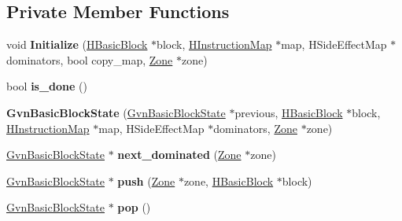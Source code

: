 \subsection*{Private Member Functions}
\begin{DoxyCompactItemize}
\item 
void {\bfseries Initialize} (\hyperlink{classv8_1_1internal_1_1_h_basic_block}{H\+Basic\+Block} $\ast$block, \hyperlink{classv8_1_1internal_1_1_h_instruction_map}{H\+Instruction\+Map} $\ast$map, H\+Side\+Effect\+Map $\ast$dominators, bool copy\+\_\+map, \hyperlink{classv8_1_1internal_1_1_zone}{Zone} $\ast$zone)\hypertarget{classv8_1_1internal_1_1_gvn_basic_block_state_ae5463e112b8d81ce383a5835380035be}{}\label{classv8_1_1internal_1_1_gvn_basic_block_state_ae5463e112b8d81ce383a5835380035be}

\item 
bool {\bfseries is\+\_\+done} ()\hypertarget{classv8_1_1internal_1_1_gvn_basic_block_state_ac8820611886e4e9bfa41b25525c80591}{}\label{classv8_1_1internal_1_1_gvn_basic_block_state_ac8820611886e4e9bfa41b25525c80591}

\item 
{\bfseries Gvn\+Basic\+Block\+State} (\hyperlink{classv8_1_1internal_1_1_gvn_basic_block_state}{Gvn\+Basic\+Block\+State} $\ast$previous, \hyperlink{classv8_1_1internal_1_1_h_basic_block}{H\+Basic\+Block} $\ast$block, \hyperlink{classv8_1_1internal_1_1_h_instruction_map}{H\+Instruction\+Map} $\ast$map, H\+Side\+Effect\+Map $\ast$dominators, \hyperlink{classv8_1_1internal_1_1_zone}{Zone} $\ast$zone)\hypertarget{classv8_1_1internal_1_1_gvn_basic_block_state_afee21a8ad9e4ffe8b3d060381407a53b}{}\label{classv8_1_1internal_1_1_gvn_basic_block_state_afee21a8ad9e4ffe8b3d060381407a53b}

\item 
\hyperlink{classv8_1_1internal_1_1_gvn_basic_block_state}{Gvn\+Basic\+Block\+State} $\ast$ {\bfseries next\+\_\+dominated} (\hyperlink{classv8_1_1internal_1_1_zone}{Zone} $\ast$zone)\hypertarget{classv8_1_1internal_1_1_gvn_basic_block_state_a7948fe3ae70e2a3ecc8629164f9c61c0}{}\label{classv8_1_1internal_1_1_gvn_basic_block_state_a7948fe3ae70e2a3ecc8629164f9c61c0}

\item 
\hyperlink{classv8_1_1internal_1_1_gvn_basic_block_state}{Gvn\+Basic\+Block\+State} $\ast$ {\bfseries push} (\hyperlink{classv8_1_1internal_1_1_zone}{Zone} $\ast$zone, \hyperlink{classv8_1_1internal_1_1_h_basic_block}{H\+Basic\+Block} $\ast$block)\hypertarget{classv8_1_1internal_1_1_gvn_basic_block_state_a68540690ad23f87a0948a167feae2a48}{}\label{classv8_1_1internal_1_1_gvn_basic_block_state_a68540690ad23f87a0948a167feae2a48}

\item 
\hyperlink{classv8_1_1internal_1_1_gvn_basic_block_state}{Gvn\+Basic\+Block\+State} $\ast$ {\bfseries pop} ()\hypertarget{classv8_1_1internal_1_1_gvn_basic_block_state_acd7b1becc1b71bedda48c61a63d5ca95}{}\label{classv8_1_1internal_1_1_gvn_basic_block_state_acd7b1becc1b71bedda48c61a63d5ca95}

\end{DoxyCompactItemize}
